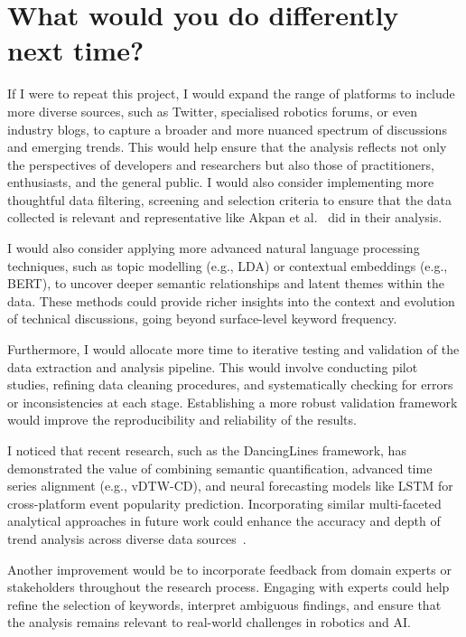 \documentclass[sigconf, nonacm]{acmart}
\begin{document}
\section{What would you do differently next time?}
If I were to repeat this project, I would expand the range of platforms to include more diverse sources, such as Twitter, specialised robotics forums, or even industry blogs, to capture a broader and more nuanced spectrum of discussions and emerging trends. This would help ensure that the analysis reflects not only the perspectives of developers and researchers but also those of practitioners, enthusiasts, and the general public. I would also consider implementing more thoughtful data filtering, screening and selection criteria to ensure that the data collected is relevant and representative like Akpan et al.~\cite{AkpanIkpeJustice2025Caga} did in their analysis.

I would also consider applying more advanced natural language processing techniques, such as topic modelling (e.g., LDA) or contextual embeddings (e.g., BERT), to uncover deeper semantic relationships and latent themes within the data. These methods could provide richer insights into the context and evolution of technical discussions, going beyond surface-level keyword frequency.

Furthermore, I would allocate more time to iterative testing and validation of the data extraction and analysis pipeline. This would involve conducting pilot studies, refining data cleaning procedures, and systematically checking for errors or inconsistencies at each stage. Establishing a more robust validation framework would improve the reproducibility and reliability of the results.

I noticed that recent research, such as the DancingLines framework, has demonstrated the value of combining semantic quantification, advanced time series alignment (e.g., vDTW-CD), and neural forecasting models like LSTM for cross-platform event popularity prediction. Incorporating similar multi-faceted analytical approaches in future work could enhance the accuracy and depth of trend analysis across diverse data sources~\cite{GaoXiaofeng2023CEPA}.

Another improvement would be to incorporate feedback from domain experts or stakeholders throughout the research process. Engaging with experts could help refine the selection of keywords, interpret ambiguous findings, and ensure that the analysis remains relevant to real-world challenges in robotics and AI.
\end{document}
